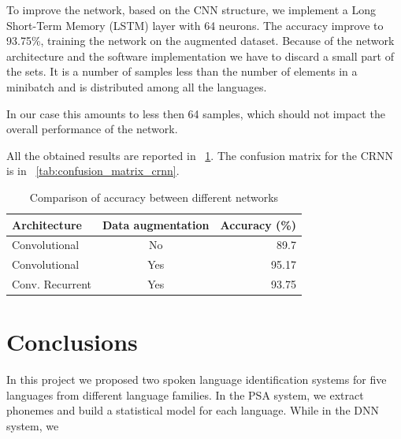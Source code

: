 \documentclass{article}
\begin{document}
To improve the network, based on the CNN structure, we implement a Long Short-Term Memory (LSTM) layer with 64 neurons. 
The accuracy improve to 93.75\%, training the network on the augmented dataset.
Because of the network architecture and the software implementation we have to discard a small part of the sets. It is a number of samples less than the number of elements in a minibatch and is distributed among all the languages.

In our case this amounts to less then 64 samples, which should not impact the overall performance of the network.

All the obtained results are reported in \tablename~\ref{tab:dnn-acc-comp}. The confusion matrix for the CRNN is in \tablename~\ref{tab:confusion_matrix_crnn}.

\begin{table}
  \centering
  \begin{tabular}{lcr}
    \toprule
    Architecture & Data augmentation & Accuracy (\si{\percent}) \\
    \midrule
    Convolutional & No & 89.7 \\
    Convolutional & Yes & 95.17 \\
    Conv. Recurrent & Yes & 93.75 \\
    \bottomrule
  \end{tabular}
  \caption{Comparison of accuracy between different networks}\label{tab:dnn-acc-comp}
\end{table}

\section{Conclusions}
\label{sec:conclusion}

In this project we proposed two spoken language identification systems for five languages from different language families. In the PSA system, we extract phonemes and build a statistical model for each language. While in the DNN system, we 
 




\end{document}
